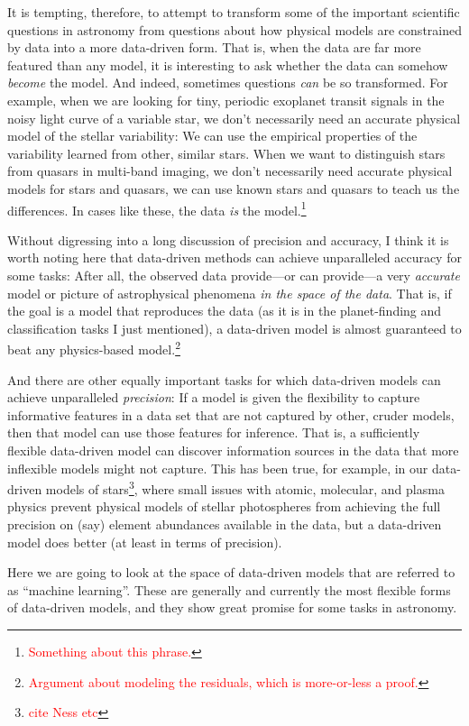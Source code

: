 \documentclass[12pt, letterpaper]{article}
\newcommand{\todo}[1]{\textcolor{red}{#1}}  %
\begin{document}
It is tempting, therefore, to attempt to transform some of the important
scientific questions in astronomy from questions about how physical models are
constrained by data into a more data-driven form.
That is, when the data are far more featured than any model, it is interesting
to ask whether the data can somehow \emph{become} the model.
And indeed, sometimes questions \emph{can} be so transformed.
For example, when we are looking for tiny, periodic exoplanet transit
signals in the noisy light curve of a variable star, we don't necessarily
need an accurate physical model of the stellar variability:
We can use the empirical properties of the variability learned from
other, similar stars.
When we want to distinguish stars from quasars in multi-band imaging, we
don't necessarily need accurate physical models for stars and quasars,
we can use known stars and quasars to teach us the differences.
In cases like these, the data \emph{is} the model.\footnote{\todo{Something about this phrase.}}

Without digressing into a long discussion of precision and accuracy, I
think it is worth noting here that data-driven methods can achieve
unparalleled accuracy for some tasks:
After all, the observed data provide---or can provide---a very
\emph{accurate} model or picture of astrophysical phenomena \emph{in
  the space of the data}.
That is, if the goal is a model that reproduces the data (as it is in
the planet-finding and classification tasks I just mentioned), a
data-driven model is almost guaranteed to beat any physics-based
model.\footnote{\todo{Argument about modeling the residuals, which is
    more-or-less a proof.}}

And there are other equally important tasks for which data-driven
models can achieve unparalleled \emph{precision}:
If a model is given the flexibility to capture informative features
in a data set that are not captured by other, cruder models, then that
model can use those features for inference.
That is, a sufficiently flexible data-driven model can discover information
sources in the data that more inflexible models might not capture.
This has been true, for example, in our data-driven models of stars\footnote{\todo{cite Ness etc}},
where small issues with atomic, molecular, and plasma physics prevent
physical models of stellar photospheres from achieving the full precision
on (say) element abundances available in the data, but a data-driven
model does better (at least in terms of precision).

Here we are going to look at the space of data-driven models that are
referred to as ``machine learning''.
These are generally and currently the most flexible forms of data-driven
models, and they show great promise for some tasks in astronomy.
\end{document}
